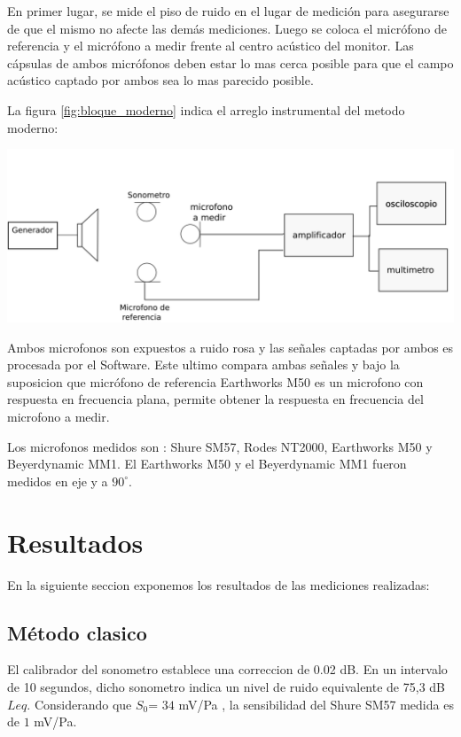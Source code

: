 \documentclass[]{article}
\makeatletter
\newenvironment{figurehere}   %
  {\def\@captype{figure}}   %
  {\par\medskip}
  {}              %
\makeatother
\begin{document}
\begin{multicols}{2}
En primer lugar, se mide el piso de ruido en el lugar de medición para asegurarse
de que el mismo no afecte las demás mediciones. Luego se coloca el micrófono de
referencia y el micrófono a medir frente al centro acústico del monitor.
Las cápsulas de ambos micrófonos deben estar lo mas cerca posible para que el
campo acústico captado por ambos sea lo mas parecido posible.

La figura \ref{fig:bloque_moderno} indica el arreglo instrumental del metodo
moderno:

\begin{figurehere}
 \centering
 \includegraphics[width=\linewidth]{blockdiag}
 \label{fig:bloque_clasico}
\end{figurehere}

Ambos microfonos son expuestos a ruido rosa y las señales captadas por ambos
es procesada por el Software. Este ultimo compara ambas señales y bajo la
suposicion que micrófono de referencia Earthworks M50 es un microfono con
respuesta en frecuencia plana, permite obtener la respuesta en frecuencia del
microfono a medir.

Los microfonos medidos son : Shure SM57, Rodes NT2000, Earthworks M50 y
Beyerdynamic MM1. El Earthworks M50 y el Beyerdynamic MM1 fueron medidos en eje
y a $90^\circ$.

\section{Resultados}
En la siguiente seccion exponemos los resultados de las mediciones realizadas:
\subsection{Método clasico}

El calibrador del sonometro establece una correccion de 0.02 dB. En un intervalo
de 10 segundos, dicho sonometro indica un nivel de ruido equivalente de 75,3 dB
$L{eq}$. Considerando que $S_0$= $34$ mV/Pa , la sensibilidad del Shure SM57 medida es de
$1$ mV/Pa.


\end{multicols}
\end{document}
